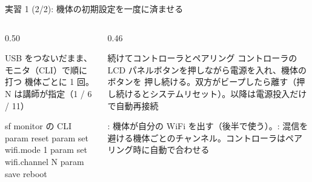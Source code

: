 \begin{frame}[fragile]{実習 1 (2/2): 機体の初期設定を一度に済ませる}
  \vspace{0.2em}
  \begin{columns}[T]
    \begin{column}{0.50\textwidth}
      \begin{block}{USB をつないだまま、モニタ（CLI）で順に打つ}
        \footnotesize 機体ごとに 1 回。N は講師が指定（1 / 6 / 11）
        \begin{sflisting}[basicstyle=\ttfamily\scriptsize]{sf monitor の CLI}
param reset
param set wifi.mode 1
param set wifi.channel N
param save
reboot
        \end{sflisting}
      \end{block}
    \end{column}
    \begin{column}{0.46\textwidth}
      \begin{exampleblock}{続けてコントローラとペアリング}
        \footnotesize コントローラの LCD パネルボタンを押しながら電源を入れ、機体のボタンを 押し続ける。双方がビープしたら離す（押し続けるとシステムリセット）。以降は電源投入だけで自動再接続
      \end{exampleblock}
      {\footnotesize {}: 機体が自分の WiFi を出す（後半で使う）。: 混信を避ける機体ごとのチャンネル。コントローラはペアリング時に自動で合わせる}
    \end{column}
  \end{columns}
\end{frame}

